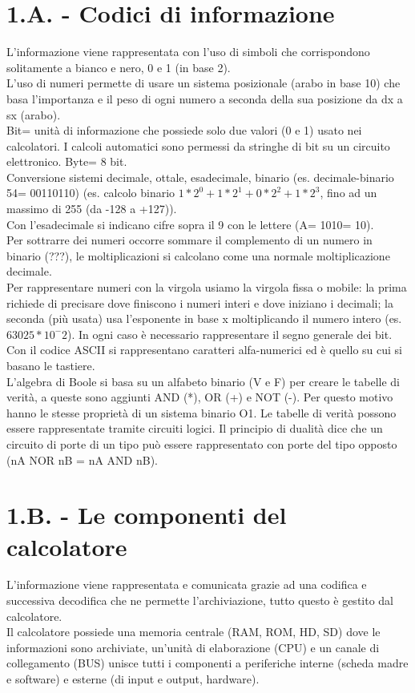 \documentclass[10pt]{article}
\begin{document}
\section*{1.A. - Codici di informazione}
L'informazione viene rappresentata con l'uso di simboli che corrispondono solitamente a bianco e nero, 0 e 1 (in base 2).\\
L'uso di numeri permette di usare un sistema posizionale (arabo in base 10) che basa l'importanza e il peso di ogni numero a seconda della sua posizione da dx a sx (arabo).\\
Bit= unità di informazione che possiede solo due valori (0 e 1) usato nei calcolatori. I calcoli automatici sono permessi da stringhe di bit su un circuito elettronico. Byte= 8 bit.\\
Conversione sistemi decimale, ottale, esadecimale, binario (es. decimale-binario 54= 00110110) (es. calcolo binario $1*2^0+1*2^1+0*2^2+1*2^3$, fino ad un massimo di 255 (da -128 a +127)).\\
Con l'esadecimale si indicano cifre sopra il 9 con le lettere (A= 1010= 10).\\
Per sottrarre dei numeri occorre sommare il complemento di un numero in binario (???), le moltiplicazioni si calcolano come una normale moltiplicazione decimale.\\
Per rappresentare numeri con la virgola usiamo la virgola fissa o mobile: la prima richiede di precisare dove finiscono i numeri interi e dove iniziano i decimali; la seconda (più usata) usa l'esponente in base x moltiplicando il numero intero (es. $63025*10^-2$). In ogni caso è necessario rappresentare il segno generale dei bit. \\
Con il codice ASCII si rappresentano caratteri alfa-numerici ed è quello su cui si basano le tastiere. \\
L'algebra di Boole si basa su un alfabeto binario (V e F) per creare le tabelle di verità, a queste sono aggiunti AND (*), OR (+) e NOT (-). Per questo motivo hanno le stesse proprietà di un sistema binario O1. Le tabelle di verità possono essere rappresentate tramite circuiti logici. 
Il principio di dualità dice che un circuito di porte di un tipo può essere rappresentato con porte del tipo opposto (nA NOR nB = nA AND nB).
\section*{1.B. - Le componenti del calcolatore}
L'informazione viene rappresentata e comunicata grazie ad una codifica e successiva decodifica che ne permette l'archiviazione, tutto questo è gestito dal calcolatore.\\
Il calcolatore possiede una memoria centrale (RAM, ROM, HD, SD) dove le informazioni sono archiviate, un'unità di elaborazione (CPU) e un canale di collegamento (BUS) unisce tutti i componenti a periferiche interne (scheda madre e software) e esterne (di input e output, hardware). \\
\end{document}
